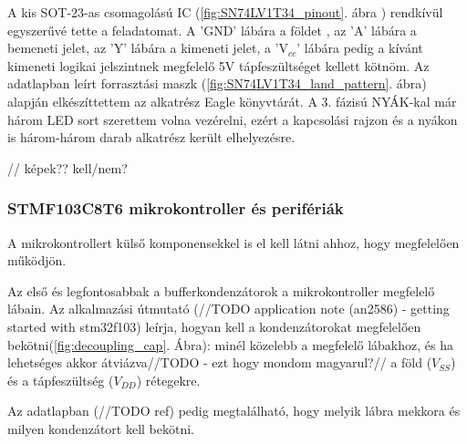 \documentclass[../main.tex]{subfiles}
\begin{document}
            
            A kis SOT-23-as csomagolású IC (\ref{fig:SN74LV1T34_pinout}. ábra ) rendkívül egyszerűvé tette a feladatomat. A 'GND' lábára a földet , az 'A' lábára a bemeneti jelet, az 'Y' lábára a kimeneti jelet, a 'V$_{cc}$' lábára pedig a kívánt kimeneti logikai jelszintnek megfelelő 5V tápfeszültséget kellett kötnöm. Az adatlapban leírt forrasztási maszk (\ref{fig:SN74LV1T34_land_pattern}. ábra) alapján elkészíttettem az alkatrész Eagle könyvtárát. A 3. fázisú NYÁK-kal már három LED sort szerettem volna vezérelni, ezért a kapcsolási rajzon és a nyákon is három-három darab alkatrész került elhelyezésre.
            
            // képek?? kell/nem? %
        
        \subsubsection{STMF103C8T6 mikrokontroller és perifériák}
            A mikrokontrollert külső komponensekkel is el kell látni ahhoz, hogy megfelelően működjön. 
            
            Az első és legfontosabbak a bufferkondenzátorok a mikrokontroller megfelelő lábain. Az alkalmazási útmutató (//TODO application note (an2586) - getting started with stm32f103) leírja, hogyan kell a kondenzátorokat megfelelően bekötni(\ref{fig:decoupling_cap}. Ábra): minél közelebb a megfelelő lábakhoz, és ha lehetséges akkor átviázva//TODO - ezt hogy mondom magyarul?// a föld ($V_{SS}$) és a tápfeszültség ($V_{DD}$) rétegekre. 
            
            Az adatlapban (//TODO ref) pedig megtalálható, hogy melyik lábra mekkora és milyen kondenzátort kell bekötni.
            
\end{document}
